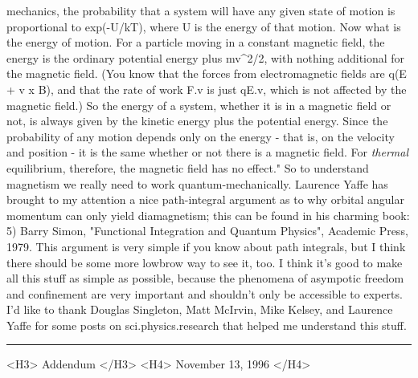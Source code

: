 mechanics, the probability that a system will have any given state
of motion is proportional to exp(-U/kT), where U is the energy of
that motion.  Now what is the energy of motion.  For a particle moving
in a constant magnetic field, the energy is the ordinary potential energy
plus mv^2/2, with nothing additional for the magnetic field.  (You
know that the forces from electromagnetic fields are q(E + v x B),
and that the rate of work F.v is just qE.v, which is not affected by
the magnetic field.)  So the energy of a system, whether it is in
a magnetic field or not, is always given by the kinetic energy plus
the potential energy.  Since the probability of any motion depends only
on the energy - that is, on the velocity and position - it is the same
whether or not there is a magnetic field.  For \emph{thermal} equilibrium,
therefore, the magnetic field has no effect."   
So to understand magnetism we really need to work quantum-mechanically.
Laurence Yaffe has brought to my attention a nice path-integral argument
as to why orbital angular momentum can only yield diamagnetism; this
can be found in his charming book:
5) Barry Simon, "Functional Integration and Quantum Physics", Academic
Press, 1979.
This argument is very simple if you know about path integrals, but
I think there should be some more lowbrow way to see it, too.  I think
it's good to make all this stuff as simple as possible, because
the phenomena of asympotic freedom and confinement are very important
and shouldn't only be accessible to experts.  
I'd like to thank Douglas Singleton, Matt McIrvin, Mike Kelsey, and
Laurence Yaffe for some posts on sci.physics.research that helped
me understand this stuff.

\par\noindent\rule{\textwidth}{0.4pt}

<H3> Addendum </H3>
<H4> November 13, 1996 </H4>

